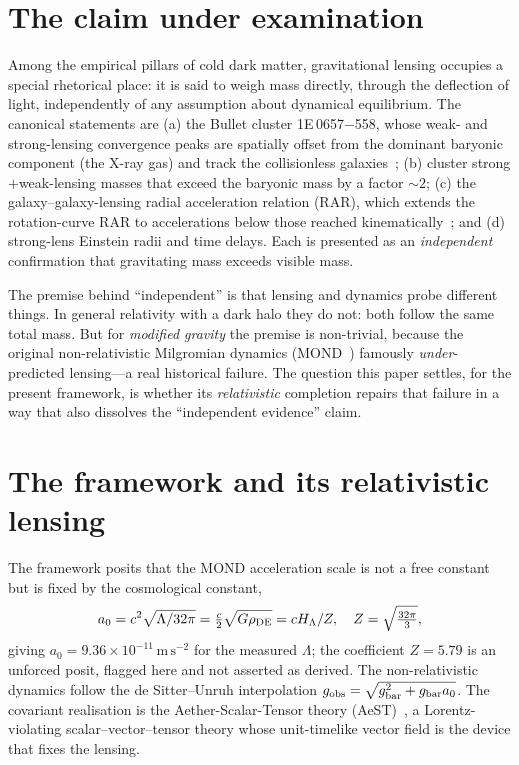 \documentclass[aps,prd,twocolumn,10pt,nofootinbib,superscriptaddress]{revtex4-2}
\begin{document}
\section{The claim under examination}
Among the empirical pillars of cold dark matter, gravitational lensing occupies a special rhetorical place: it is
said to weigh mass directly, through the deflection of light, independently of any assumption about dynamical
equilibrium. The canonical statements are (a) the Bullet cluster 1E\,0657$-$558, whose weak- and strong-lensing
convergence peaks are spatially offset from the dominant baryonic component (the X-ray gas) and track the
collisionless galaxies~\cite{Clowe2006}; (b) cluster strong$+$weak-lensing masses that exceed the baryonic mass by a
factor $\sim2$; (c) the galaxy--galaxy-lensing radial acceleration relation (RAR), which extends the rotation-curve
RAR to accelerations below those reached kinematically~\cite{Brouwer2021}; and (d) strong-lens Einstein radii and
time delays. Each is presented as an \emph{independent} confirmation that gravitating mass exceeds visible mass.

The premise behind ``independent'' is that lensing and dynamics probe different things. In general relativity with a
dark halo they do not: both follow the same total mass. But for \emph{modified gravity} the premise is non-trivial,
because the original non-relativistic Milgromian dynamics (MOND~\cite{Milgrom1983}) famously \emph{under}-predicted
lensing---a real historical failure. The question this paper settles, for the present framework, is whether its
\emph{relativistic} completion repairs that failure in a way that also dissolves the ``independent evidence'' claim.

\section{The framework and its relativistic lensing}
The framework posits that the MOND acceleration scale is not a free constant but is fixed by the cosmological
constant,
\begin{equation}
a_0=c^2\sqrt{\Lambda/32\pi}=\tfrac{c}{2}\sqrt{G\rho_{\rm DE}}=cH_\Lambda/Z,\quad Z=\sqrt{\tfrac{32\pi}{3}},
\label{eq:a0}
\end{equation}
giving $a_0=9.36\times10^{-11}\,\mathrm{m\,s^{-2}}$ for the measured $\Lambda$; the coefficient $Z=5.79$ is an
unforced posit, flagged here and not asserted as derived. The non-relativistic dynamics follow the de Sitter--Unruh
interpolation $g_{\rm obs}=\sqrt{g_{\rm bar}^2+g_{\rm bar}a_0}$. The covariant realisation is the Aether-Scalar-Tensor
theory (AeST)~\cite{Skordis2021}, a Lorentz-violating scalar--vector--tensor theory whose unit-timelike vector field
is the device that fixes the lensing.
\end{document}
